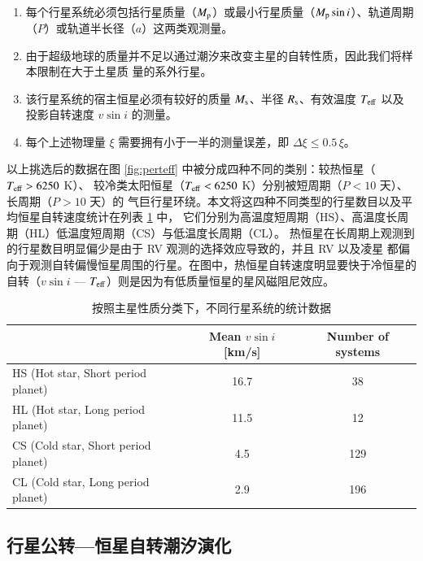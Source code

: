 \begin{enumerate}
\item 每个行星系统必须包括行星质量（$M_\mathrm{p}$）或最小行星质量（$M_\mathrm{p} \sin i$）、轨道周期
（$P$）或轨道半长径（$a$）这两类观测量。
\item 由于超级地球的质量并不足以通过潮汐来改变主星的自转性质，因此我们将样本限制在大于土星质
量的系外行星。
\item 该行星系统的宿主恒星必须有较好的质量 $M_\mathrm{s}$、半径 $R_\mathrm{s}$、有效温度 $T_\mathrm{eff}$ 以及
投影自转速度 $v \sin i$ 的测量。
\item 每个上述物理量 $\xi$ 需要拥有小于一半的测量误差，即 $\Delta \xi  \leq 0.5 \, \xi$。
\end{enumerate}

以上挑选后的数据在图 \ref{fig:perteff} 中被分成四种不同的类别：较热恒星（$T_\mathrm{eff} > 6250 $ K）、
较冷类太阳恒星（$T_\mathrm{eff} < 6250 $ K）分别被短周期（$P < 10 $ 天）、长周期（$P >10 $ 天）的
气巨行星环绕。本文将这四种不同类型的行星数目以及平均恒星自转速度统计在列表 \ref{tbl:stat} 中，
它们分别为高温度短周期（HS）、高温度长周期（HL）低温度短周期（CS）与低温度长周期（CL）。
热恒星在长周期上观测到的行星数目明显偏少是由于 RV 观测的选择效应导致的，并且 RV 以及凌星
都偏向于观测自转偏慢恒星周围的行星。在图中，热恒星自转速度明显要快于冷恒星的自转（$v\sin i$ 
--- $T_\mathrm{eff}$）则是因为有低质量恒星的星风磁阻尼效应\cite{Kraft1967}。

{\renewcommand{\arraystretch}{1.3}
\begin{table}[t]
\centering
\caption{按照主星性质分类下，不同行星系统的统计数据}
\label{tbl:stat}
\begin{tabularx}{0.9\textwidth}{@{\extracolsep{\fill}}lcc}
\toprule
  &  Mean $v \sin i $ [km/s]  & Number of systems \\ \midrule 
HS (Hot star, Short period planet) & 16.7       & 38                \\ 
HL (Hot star, Long period planet) & 11.5       & 12                 \\ 
CS (Cold star, Short period planet) & 4.5        & 129               \\ 
CL (Cold star, Long period planet) & 2.9        & 196                \\ \bottomrule
\end{tabularx}
\end{table}
}

\subsection{行星公转---恒星自转潮汐演化} \label{sec:obliquityevo}

